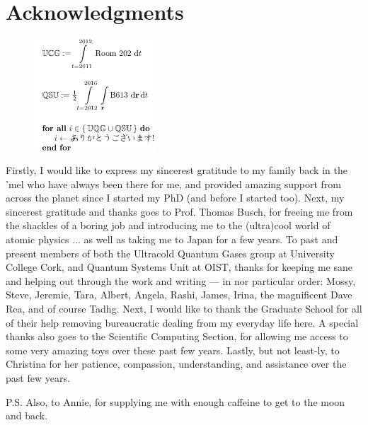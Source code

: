 \chapter*{Acknowledgments}

\begin{figure}[h!]\centering
\includegraphics[width=0.4\textwidth]{Preamble/ack_stand/ack_stand}
\end{figure}

Firstly, I would like to express my sincerest gratitude to my family back in the 'mel who have always been there for me, and provided amazing support from across the planet since I started my PhD (and before I started too). Next, my sincerest gratitude and thanks goes to Prof. Thomas Busch, for freeing me from the shackles of a boring job and introducing me to the (ultra)cool world of atomic physics ... as well as taking me to Japan for a few years. To past and present members of both the Ultracold Quantum Gases group at University College Cork, and Quantum Systems Unit at OIST, thanks for keeping me sane and helping out through the work and writing --- in nor particular order: Mossy, Steve, Jeremie, Tara, Albert, Angela, Rashi, James, Irina, the magnificent Dave Rea, and of course Tadhg. Next, I would like to thank the Graduate School for all of their help removing bureaucratic dealing from my everyday life here. A special thanks also goes to the Scientific Computing Section, for allowing me access to some very amazing toys over these past few years. Lastly, but not least-ly, to Christina for her patience, compassion, understanding, and assistance over the past few years.

P.S. Also, to Annie, for supplying me with enough caffeine to get to the moon and back.
